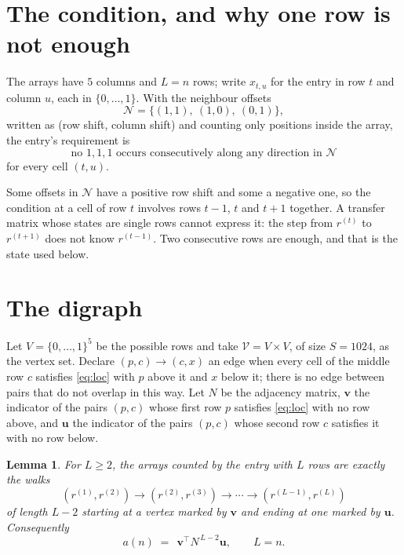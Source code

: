 \documentclass[11pt,a4paper]{article}
\theoremstyle{plain}
\newtheorem{lemma}[theorem]{Lemma}
\theoremstyle{definition}
\begin{document}
\section{The condition, and why one row is not enough}

The arrays have $5$ columns and $L=n$ rows; write $x_{t,u}$ for the entry in
row $t$ and column $u$, each in $\{0,\dots,1\}$. With the neighbour offsets
\[
\mathcal N=\{(1,1),\ (1,0),\ (0,1)\},
\]
written as (row shift, column shift) and counting only positions inside the array, the
entry's requirement is
\begin{equation}\label{eq:loc}
\text{no }1,1,1\text{ occurs consecutively along any direction in }\mathcal N
\end{equation}
for every cell $(t,u)$.

Some offsets in $\mathcal N$ have a positive row shift and some a negative one, so the
condition at a cell of row $t$ involves rows $t-1$, $t$ and $t+1$ together. A transfer
matrix whose states are single rows cannot express it: the step from $r^{(t)}$ to
$r^{(t+1)}$ does not know $r^{(t-1)}$. Two consecutive rows are enough, and that is
the state used below.

\section{The digraph}

Let $V=\{0,\dots,1\}^{5}$ be the possible rows and take
$\mathcal V=V\times V$, of size $S=1024$, as the vertex set. Declare $(p,c)\to(c,x)$ an edge
when every cell of the middle row $c$ satisfies \eqref{eq:loc} with $p$ above it and $x$
below it; there is no edge between pairs that do not overlap in this way. Let $N$ be the
adjacency matrix, $\mathbf{v}$ the indicator of the pairs $(p,c)$ whose first row $p$
satisfies \eqref{eq:loc} with no row above, and $\mathbf{u}$ the indicator of
the pairs $(p,c)$ whose second row $c$ satisfies it with no row below.

\begin{lemma}\label{lem:walk}
For $L\ge2$, the arrays counted by the entry with $L$ rows are exactly the walks
\[
(r^{(1)},r^{(2)})\to(r^{(2)},r^{(3)})\to\cdots\to(r^{(L-1)},r^{(L)})
\]
of length $L-2$ starting at a vertex marked by $\mathbf{v}$ and ending at one marked by
$\mathbf{u}$. Consequently
\[
a(n)\;=\;\,\mathbf{v}^{\!\top}N^{\,L-2}\mathbf{u},\qquad L=n .
\]
\end{lemma}
\end{document}
